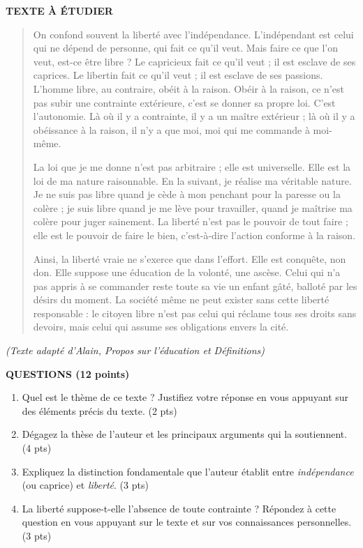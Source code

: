 \documentclass[11pt]{article}
\begin{document}
\vspace{0.5cm}

\textbf{TEXTE À ÉTUDIER}
\begin{quote}
\og On confond souvent la liberté avec l'indépendance. L'indépendant est celui qui ne dépend de personne, qui fait ce qu'il veut. Mais faire ce que l'on veut, est-ce être libre ? Le capricieux fait ce qu'il veut ; il est esclave de ses caprices. Le libertin fait ce qu'il veut ; il est esclave de ses passions. L'homme libre, au contraire, obéit à la raison. Obéir à la raison, ce n'est pas subir une contrainte extérieure, c'est se donner sa propre loi. C'est l'autonomie. Là où il y a contrainte, il y a un maître extérieur ; là où il y a obéissance à la raison, il n'y a que moi, moi qui me commande à moi-même.

La loi que je me donne n'est pas arbitraire ; elle est universelle. Elle est la loi de ma nature raisonnable. En la suivant, je réalise ma véritable nature. Je ne suis pas libre quand je cède à mon penchant pour la paresse ou la colère ; je suis libre quand je me lève pour travailler, quand je maîtrise ma colère pour juger sainement. La liberté n'est pas le pouvoir de tout faire ; elle est le pouvoir de faire le bien, c'est-à-dire l'action conforme à la raison.

Ainsi, la liberté vraie ne s'exerce que dans l'effort. Elle est conquête, non don. Elle suppose une éducation de la volonté, une ascèse. Celui qui n'a pas appris à se commander reste toute sa vie un enfant gâté, balloté par les désirs du moment. La société même ne peut exister sans cette liberté responsable : le citoyen libre n'est pas celui qui réclame tous ses droits sans devoirs, mais celui qui assume ses obligations envers la cité. \fg
\end{quote}
\textit{(Texte adapté d'Alain, \emph{Propos sur l'éducation} et \emph{Définitions})}

\vspace{0.5cm}

\textbf{QUESTIONS (12 points)}
\begin{enumerate}
    \item Quel est le thème de ce texte ? Justifiez votre réponse en vous appuyant sur des éléments précis du texte. (2 pts)
    \item Dégagez la thèse de l'auteur et les principaux arguments qui la soutiennent. (4 pts)
    \item Expliquez la distinction fondamentale que l'auteur établit entre \emph{indépendance} (ou caprice) et \emph{liberté}. (3 pts)
    \item \og La liberté suppose-t-elle l'absence de toute contrainte ? \fg Répondez à cette question en vous appuyant sur le texte et sur vos connaissances personnelles. (3 pts)
\end{enumerate}
\end{document}
